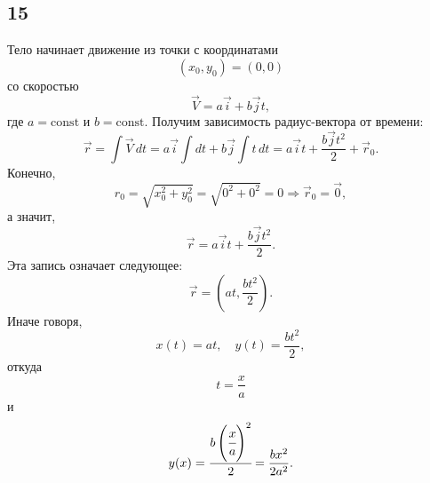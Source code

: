 \subsection{15}

Тело начинает движение из точки с координатами
\[
(x_0,y_0)=(0,0)
\]
со скоростью
\[
\vec V=a\vec i+b\vec jt,
\]
где $a=\text{const}$ и $b=\text{const}$. Получим зависимость радиус-вектора от времени:
\[
\vec r=\int\vec V\,dt=a\vec i\int dt+b\vec j\int t\,dt=a\vec it+\frac{b\vec jt^2}{2}+\vec r_0.
\]
Конечно,
\[
r_0=\sqrt{x_0^2+y_0^2}=\sqrt{0^2+0^2}=0\Rightarrow\vec r_0=\vec0,
\]
а значит,
\[
\vec r=a\vec it+\frac{b\vec jt^2}{2}.
\]
Эта запись означает следующее:
\[
\vec r=\left(at,\frac{bt^2}{2}\right).
\]
Иначе говоря,
\[
x(t)=at,\quad y(t)=\frac{bt^2}{2},
\]
откуда
\[
t=\frac{x}{a}
\]
и
\[
y(x)=\cfrac{b\left(\cfrac{x}{a}\right)^2}{2}=\frac{bx^2}{2a^2}.
\]